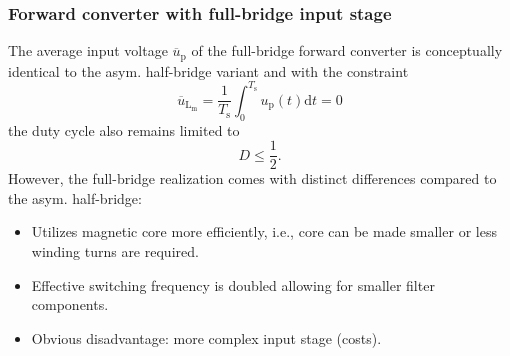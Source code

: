 \begin{frame}
    \frametitle{Forward converter with full-bridge input stage}
    The average input voltage $\overline{u}_\mathrm{p}$ of the full-bridge forward converter is conceptually identical to the asym. half-bridge variant and with the constraint
    \begin{equation*}
        \overline{u}_\mathrm{L_\mathrm{m}} = \frac{1}{T_\mathrm{s}}\int_{0}^{T_\mathrm{s}}u_\mathrm{p}(t)\mathrm{d}t = 0
    \end{equation*}
    the duty cycle also remains limited to
    $$
    D\leq\frac{1}{2} .
    $$\pause
    However, the full-bridge realization comes with distinct differences compared to the asym. half-bridge:
    \begin{itemize}
        \item Utilizes magnetic core more efficiently, i.e., core can be made smaller or less winding turns are required. \pause
        \item Effective switching frequency is doubled allowing for smaller filter components. \pause
        \item Obvious disadvantage: more complex input stage (costs).
    \end{itemize}
\end{frame}

